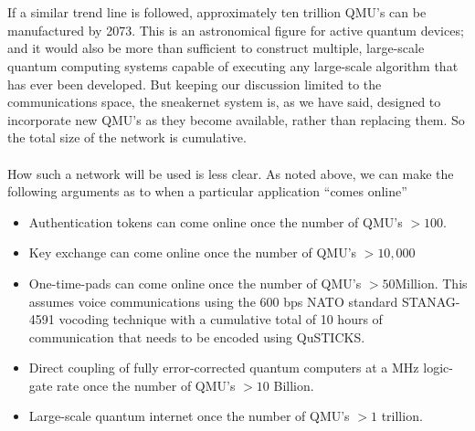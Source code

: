 \documentclass[aps,prl,twocolumn,10pt,nofootinbib]{revtex4}
\begin{document}
\\
\\
If a similar trend line is followed, approximately ten trillion QMU's can be manufactured by 2073.  This is an astronomical figure for active quantum devices; and it would also be more than sufficient to construct multiple, large-scale quantum computing systems capable of executing any large-scale algorithm that has ever been developed.  But keeping our discussion limited to the communications space, the sneakernet system is, as we have said, designed to incorporate new QMU's as they become available, rather than replacing them.  So the total size of the  network is cumulative.  
\\
\\
How such a network will be used is less clear.  As noted above, we can make the following arguments as to when a particular application ``comes online''
\begin{itemize}
\item Authentication tokens can come online once the number of QMU's $> 100$. 
\item Key exchange can come online once the number of QMU's $> 10,000$
\item One-time-pads can come online once the number of QMU's $> 50$Million.  This assumes voice communications using the 600 bps NATO standard STANAG-4591 vocoding technique with a cumulative total of 10 hours of communication that needs to be encoded using QuSTICKS.
\item Direct coupling of fully error-corrected quantum computers at a MHz logic-gate rate once the number of QMU's $> 10$ Billion. 
\item Large-scale quantum internet once the number of QMU's $> 1$ trillion.
\end{itemize}
\end{document}
